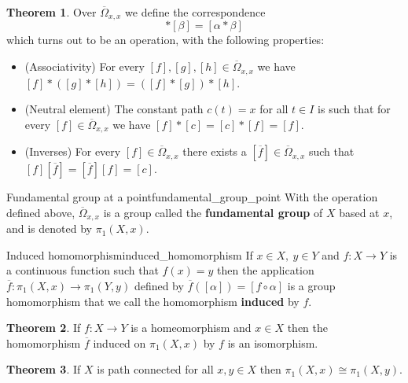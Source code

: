 \documentclass[a4paper]{book}
\theoremstyle{definition}
\newtheorem{theorem}{Theorem}[section]
\theoremstyle{ejemplo}
\theoremstyle{demostracion}
\begin{document}
\begin{theorem}
	Over $\overline{\Omega}_{x,x}$ we define the correspondence
	\begin{equation*}
		[\alpha] * [\beta] = [\alpha * \beta]
	\end{equation*}
	which turns out to be an operation, with the following properties:
	\begin{itemize}
		\item
		(Associativity) For every $[f],[g],[h] \in \overline{\Omega}_{x,x}$ we have $[f] * ([g] * [h]) = ([f] * [g]) * [h]$.
		
		\item
		(Neutral element) The constant path $c(t) = x$ for all $t \in I$ is such that for every $[f] \in \overline{\Omega}_{x,x}$ we have $[f] * [c] = [c] * [f] = [f]$.
		
		\item
		(Inverses) For every $[f] \in \overline{\Omega}_{x,x}$ there exists a $[\overline{f}] \in \overline{\Omega}_{x,x}$ such that $[f][\overline{f}] = [\overline{f}][f] = [c]$.
	\end{itemize}
\end{theorem}

\begin{define}{Fundamental group at a point}{fundamental_group_point}
	With the operation defined above, $\overline{\Omega}_{x,x}$ is a group called the \textbf{fundamental group} of $X$ based at $x$, and is denoted by $\pi_1(X, x)$.
\end{define}

\begin{define}{Induced homomorphism}{induced_homomorphism}
	If $x \in X,\ y \in Y$ and $f: X \rightarrow Y$ is a continuous function such that $f(x) = y$ then the application $\overline{f}: \pi_1(X, x) \rightarrow \pi_1(Y, y)$ defined by $\overline{f}([\alpha]) = [f \circ \alpha]$ is a group homomorphism that we call the homomorphism \textbf{induced} by $f$.
\end{define}

\begin{theorem}
	If $f: X \rightarrow Y$ is a homeomorphism and $x \in X$ then the homomorphism $\overline{f}$ induced on $\pi_1(X, x)$ by $f$ is an isomorphism.
\end{theorem}

\begin{theorem}
	If $X$ is path connected for all $x, y \in X$ then $\pi_1(X, x) \cong \pi_1(X, y)$.
\end{theorem}
\end{document}

